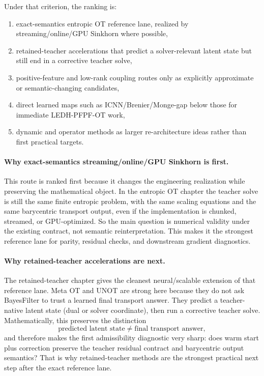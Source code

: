 \documentclass[11pt]{report}
\begin{document}
Under that criterion, the ranking is:
\begin{enumerate}[label=(\arabic*)]
  \item exact-semantics entropic OT reference lane, realized by streaming/online/GPU Sinkhorn where possible,
  \item retained-teacher accelerations that predict a solver-relevant latent state but still end in a corrective teacher solve,
  \item positive-feature and low-rank coupling routes only as explicitly approximate or semantic-changing candidates,
  \item direct learned maps such as ICNN/Brenier/Monge-gap below those for immediate LEDH-PFPF-OT work,
  \item dynamic and operator methods as larger re-architecture ideas rather than first practical targets.
\end{enumerate}

\paragraph{Why exact-semantics streaming/online/GPU Sinkhorn is first.}
This route is ranked first because it changes the engineering realization while
preserving the mathematical object.  In the entropic OT chapter the teacher solve is
still the same finite entropic problem, with the same scaling equations and the same
barycentric transport output, even if the implementation is chunked, streamed, or
GPU-optimized.  So the main question is numerical validity under the existing contract,
not semantic reinterpretation.  This makes it the strongest reference lane for parity,
residual checks, and downstream gradient diagnostics.

\paragraph{Why retained-teacher accelerations are next.}
The retained-teacher chapter gives the cleanest neural/scalable extension of that
reference lane.  Meta OT and UNOT are strong here because they do not ask BayesFilter
to trust a learned final transport answer.  They predict a teacher-native latent state
(dual or solver coordinate), then run a corrective teacher solve.  Mathematically,
this preserves the distinction
\begin{equation}
\text{predicted latent state}
\neq
\text{final transport answer},
\label{eq:ledhpfpfot-retained-distinction}
\end{equation}
and therefore makes the first admissibility diagnostic very sharp: does warm start plus
correction preserve the teacher residual contract and barycentric output semantics?
That is why retained-teacher methods are the strongest practical next step after the
exact reference lane.
\end{document}
